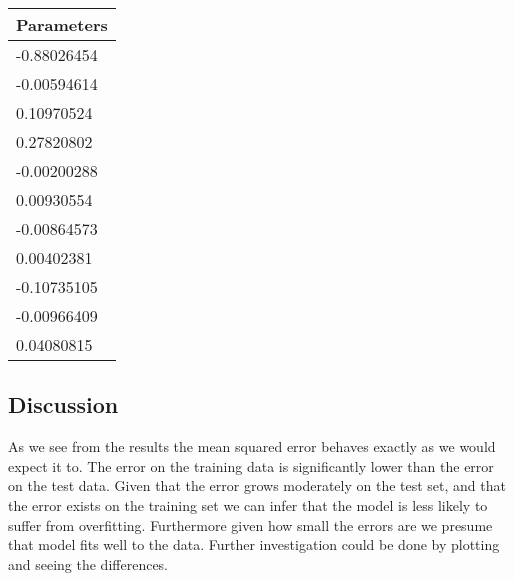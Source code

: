\begin{minipage}[b]{0.45\textwidth}
    \centering
    \label{LinReg}
\end{minipage}
\hspace{0.5cm}
\begin{minipage}[b]{0.45\textwidth}
    \centering
      \begin{tabular}{l}
        Parameters\\\hline
        -0.88026454\\
        -0.00594614\\
        0.10970524\\
        0.27820802\\
        -0.00200288\\
        0.00930554\\
        -0.00864573\\
        0.00402381\\
        -0.10735105\\
        -0.00966409\\
        0.04080815\\
      \end{tabular}
    \label{params}
\end{minipage}

\subsection{Discussion}
As we see from the results the mean squared error behaves exactly as we would expect it to. The error on the training data is significantly lower than the error on the test data. Given that the error grows moderately on the test set, and that the error exists on the training set we can infer that the model is less likely to suffer from overfitting. Furthermore given how small the errors are we presume that model fits well to the data. Further investigation could be done by plotting and seeing the differences.
